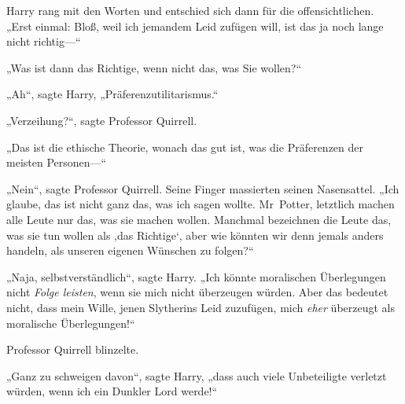 Harry rang mit den Worten und entschied sich dann für die offensichtlichen. „Erst einmal: Bloß, weil ich jemandem Leid zufügen will, ist das ja noch lange nicht richtig—“

„Was ist dann das Richtige, wenn nicht das, was Sie wollen?“

„Ah“, sagte Harry, „Präferenzutilitarismus.“

„Verzeihung?“, sagte Professor Quirrell.

„Das ist die ethische Theorie, wonach das gut ist, was die Präferenzen der meisten Personen—“

„Nein“, sagte Professor Quirrell. Seine Finger massierten seinen Nasensattel. „Ich glaube, das ist nicht ganz das, was ich sagen wollte. Mr~Potter, letztlich machen alle Leute nur das, was sie machen wollen. Manchmal bezeichnen die Leute das, was sie tun wollen als ‚das Richtige‘, aber wie könnten wir denn jemals anders handeln, als unseren eigenen Wünschen zu folgen?“

„Naja, selbstverständlich“, sagte Harry. „Ich könnte moralischen Überlegungen nicht \emph{Folge leisten}, wenn sie mich nicht überzeugen würden. Aber das bedeutet nicht, dass mein Wille, jenen Slytherins Leid zuzufügen, mich \emph{eher} überzeugt als moralische Überlegungen!“

Professor Quirrell blinzelte.

„Ganz zu schweigen davon“, sagte Harry, „dass auch viele Unbeteiligte verletzt würden, wenn ich ein Dunkler Lord werde!“

